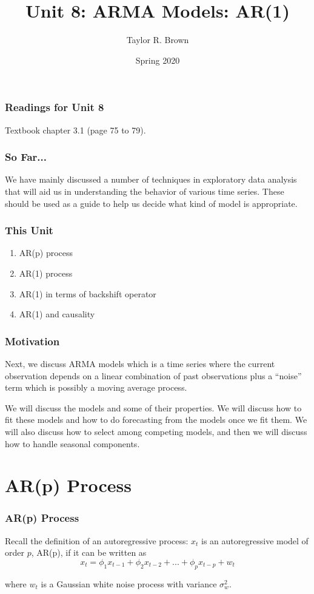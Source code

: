 \documentclass[%
xcolor=pdftex]{beamer}
\title{Unit 8: ARMA Models: AR(1)}
\author[STAT 5170: Applied Time Series, Unit 8]{Taylor R. Brown}
\institute{Department of Statistics, University of Virginia}
\date{Spring 2020}
\begin{document}
\frame{\titlepage}


\begin{frame}
\frametitle{Readings for Unit 8}

Textbook chapter 3.1 (page 75 to 79).

\end{frame}


\begin{frame}
\frametitle{So Far...}

We have mainly discussed a number of techniques in exploratory data analysis that will aid us in understanding the behavior of various time series. These should be used as a guide to help us decide what kind of model is appropriate.

\end{frame}

\begin{frame}
\frametitle{This Unit}
\begin{enumerate}
\item AR(p) process
\item AR(1) process
\item AR(1) in terms of backshift operator
\item AR(1) and causality
\end{enumerate}
\end{frame}

\begin{frame}
\frametitle{Motivation}

Next, we discuss ARMA models which is a time series where the current observation depends on a linear combination of past observations plus  a ``noise'' term which is possibly a moving average process.  
\newline

We will discuss the models and some of their properties.  We will discuss how to fit these models and how to do forecasting from the models once we fit them.  We will also discuss how to select among competing models, and then we will discuss how to handle seasonal components.

\end{frame}

\section{AR(p) Process}
\frame{\tableofcontents[currentsection]}

\begin{frame}
\frametitle{AR(p) Process}

Recall the definition of an autoregressive
process: $x_t$ is an autoregressive model of order $p$, AR(p), if it can be written as
\begin{equation} \label{eq:ar1}
x_t =\phi_1 x_{t-1} + \phi_2 x_{t-2} +...+  \phi_p x_{t-p} + w_t
\end{equation}

where $w_t$ is a Gaussian white noise process with variance $\sigma_w^2$.
\end{frame}
\end{document}
